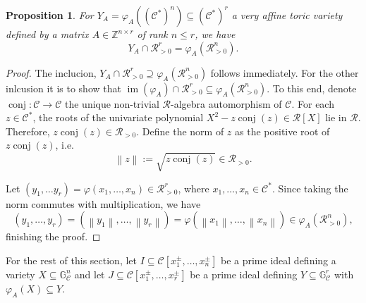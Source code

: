 \documentclass{article}
\newtheorem{proposition}[theorem]{Proposition}
\theoremstyle{definition}
\newcommand{\RR}{\mathcal{R}}
\newcommand{\CC}{\mathcal{C}}
\begin{document}
\begin{proposition}
\label{prop: positive part of toric vars}
For $Y_A =  \varphi_A \left( (\CC^*)^n \right)  \subseteq (\mathcal{C}^*)^r$ a very affine toric variety defined by a matrix $A \in \mathbb{Z}^{n \times r}$ of rank $n \leq r$, we have
\[ Y_A \cap \RR^r_{>0} = \varphi_A(\RR^n_{>0}).\]
\end{proposition}
\begin{proof}
The inclucion,  $Y_A \cap \RR^r_{>0} \supseteq \varphi_A(\RR^n_{>0})$ follows immediately. For the other inlcusion it is to show that $\operatorname{im}(\varphi_A)\cap \RR^r_{>0} \subseteq \varphi_A(\RR^n_{>0})$. To this end, denote $\operatorname{conj}\colon \CC \longrightarrow \CC$ the unique non-trivial $\RR$-algebra automorphism of $\CC$. For each $z \in \mathcal{C}^*$, the roots of the univariate polynomial $X^2- z \operatorname{conj}(z) \in \mathcal{R}[X]$ lie in $\mathcal{R}$. Therefore, $z \operatorname{conj}(z) \in \RR_{> 0}$. Define the norm of $z$ as the positive root of $z \operatorname{conj}(z)$, i.e. 
\[\left \| z \right \| := \sqrt{z \operatorname{conj}(z)} \in \RR_{>0}.\]

Let $(y_1,\dots y_r) = \varphi(x_1, \dots, x_n) \in \RR^r_{>0}$, where $x_1, \dots, x_n \in \CC^{*}$. Since taking the norm commutes with multiplication, we have 
\[(y_1, \dots, y_r) = (\left \| y_1 \right \|,\dots , \left \| y_r \right \|) = \varphi(\left \| x_1 \right \|, \dots, \left \| x_n \right \|) \in \varphi_A(\RR^n_{>0}),\]
finishing the proof.
\end{proof}


For the rest of this section, let $I \subseteq \CC[x_1^\pm, \dots, x_n^\pm]$ be a prime ideal defining a variety $X \subseteq \mathbb{G}^n_\CC$ and let
$J \subseteq \CC[x_1^\pm, \dots, x_r^\pm]$ be a prime ideal defining $Y \subseteq \mathbb{G}^r_\CC$
with $\varphi_A(X) \subseteq Y$.
\end{document}
